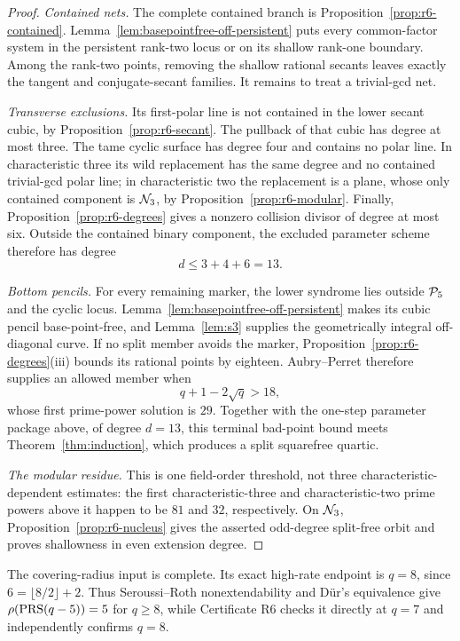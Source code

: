 \begin{proof}
\emph{Contained nets.}
The complete contained branch is
Proposition~\ref{prop:r6-contained}.
Lemma~\ref{lem:basepointfree-off-persistent} puts every common-factor system
in the persistent rank-two locus or on its shallow rank-one boundary.  Among
the rank-two points, removing the shallow rational secants leaves exactly the
tangent and conjugate-secant families.  It remains to treat a trivial-gcd net.

\emph{Transverse exclusions.}
Its first-polar line is not contained in the lower secant cubic, by
Proposition~\ref{prop:r6-secant}.  The pullback of that cubic has degree
at most three.  The tame cyclic surface has degree four and contains
no polar line.  In characteristic three its wild replacement has the
same degree and no contained trivial-gcd polar line; in characteristic
two the replacement is a plane, whose only contained component is
\(\mathcal N_3\), by Proposition~\ref{prop:r6-modular}.  Finally,
Proposition~\ref{prop:r6-degrees} gives a nonzero collision
divisor of degree at most six.  Outside the contained binary component,
the excluded parameter scheme therefore has degree
\[
                         d\leq3+4+6=13.
\]

\emph{Bottom pencils.}
For every remaining marker, the lower syndrome lies outside \(\mathcal P_5\) and the
cyclic locus.  Lemma~\ref{lem:basepointfree-off-persistent}
makes its cubic pencil base-point-free, and Lemma~\ref{lem:s3} supplies the
geometrically integral off-diagonal curve.  If no split member avoids the
marker, Proposition~\ref{prop:r6-degrees}(iii) bounds its rational points by
eighteen.  Aubry--Perret therefore supplies an allowed member when
\[
 q+1-2\sqrt q>18,
\]
whose first prime-power solution is \(29\).
Together with the one-step parameter package above, of degree \(d=13\), this
terminal bad-point bound meets Theorem~\ref{thm:induction}, which produces a
split squarefree quartic.

\emph{The modular residue.}
This is one field-order threshold, not three characteristic-dependent
estimates: the first characteristic-three and characteristic-two
prime powers above it happen to be \(81\) and \(32\), respectively.
On \(\mathcal N_3\),
Proposition~\ref{prop:r6-nucleus} gives the asserted odd-degree
split-free orbit and proves shallowness in even extension degree.
\end{proof}

The covering-radius input is complete.  Its exact high-rate endpoint is
\(q=8\), since \(6=\lfloor8/2\rfloor+2\).  Thus Seroussi--Roth
nonextendability and Dür's equivalence give
\(\rho(\operatorname{PRS}(q-5))=5\) for \(q\geq8\), while Certificate R6 checks it
directly at \(q=7\) and independently confirms \(q=8\).

